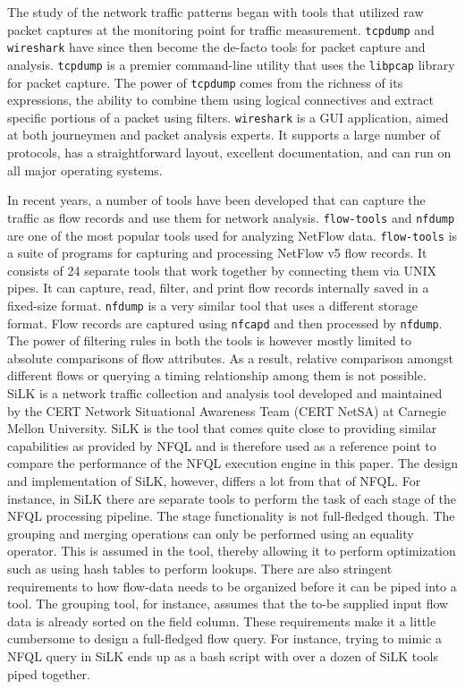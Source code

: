 The study of the network traffic patterns began with tools that utilized raw
packet captures at the monitoring point for traffic measurement.
\texttt{tcpdump} and \texttt{wireshark} have since then become the de-facto
tools for packet capture and analysis. \texttt{tcpdump} \cite{tcpdump-manpage}
is a premier command-line utility that uses the \texttt{libpcap}
\cite{pcap-manpage} library for packet capture. The power of \texttt{tcpdump}
comes from the richness of its expressions, the ability to combine them using
logical connectives and extract specific portions of a packet using filters.
\texttt{wireshark} \cite{wireshark-manpage} is a GUI application, aimed at
both journeymen and packet analysis experts. It supports a large number of
protocols, has a straightforward layout, excellent documentation, and can run
on all major operating systems.

In recent years, a number of tools have been developed that can capture the
traffic as flow records and use them for network analysis. \texttt{flow-tools}
and \texttt{nfdump} are one of the most popular tools used for analyzing
NetFlow data. \texttt{flow-tools} \cite{sromig:2000} is a suite of programs
for capturing and processing NetFlow v5 flow records. It consists of 24
separate tools that work together by connecting them via UNIX pipes. It can
capture, read, filter, and print flow records internally saved in a fixed-size
format. \texttt{nfdump} \cite{phaag:2006} is a very similar tool that uses a
different storage format. Flow records are captured using \texttt{nfcapd} and
then processed by \texttt{nfdump}. The power of filtering rules in both the
tools is however mostly limited to absolute comparisons of flow attributes. As
a result, relative comparison amongst different flows or querying a timing
relationship among them is not possible.  SiLK \cite{SiLK} is a network
traffic collection and analysis tool developed and maintained by the CERT
Network Situational Awareness Team (CERT NetSA) at Carnegie Mellon University.
SiLK is the tool that comes quite close to providing similar capabilities as
provided by \ac{NFQL} and is therefore used as a reference point to compare
the performance of the \ac{NFQL} execution engine in this paper. The design
and implementation of SiLK, however, differs a lot from that of \ac{NFQL}. For
instance, in SiLK there are separate tools to perform the task of each stage
of the \ac{NFQL} processing pipeline. The stage functionality is not
full-fledged though. The grouping and merging operations can only be performed
using an equality operator. This is assumed in the tool, thereby allowing it
to perform optimization such as using hash tables to perform lookups. There
are also stringent requirements to how flow-data needs to be organized before
it can be piped into a tool. The grouping tool, for instance, assumes that the
to-be supplied input flow data is already sorted on the field column.  These
requirements make it a little cumbersome to design a full-fledged flow query.
For instance, trying to mimic a \ac{NFQL} query in SiLK ends up as a bash
script with over a dozen of SiLK tools piped together.
